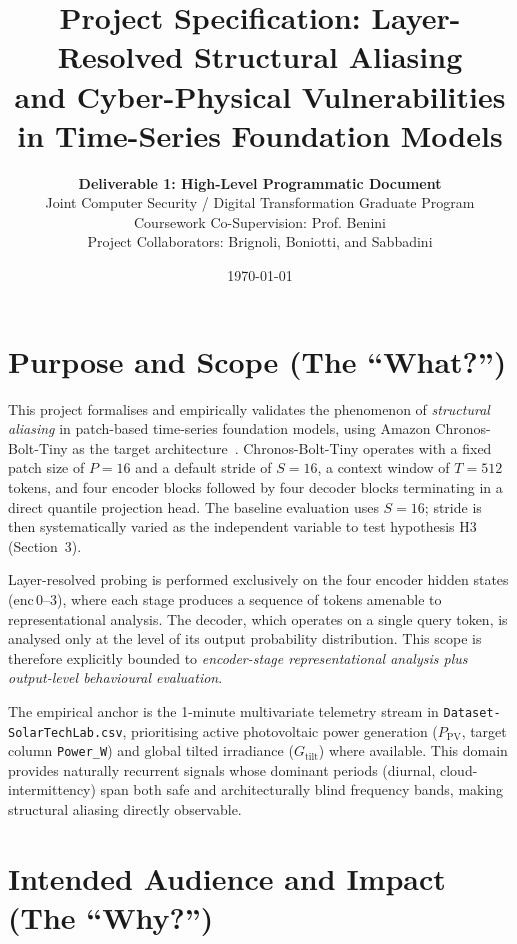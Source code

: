 \documentclass[11pt,a4paper]{article}
\title{\textbf{Project Specification: Layer-Resolved Structural Aliasing\\
and Cyber-Physical Vulnerabilities in Time-Series Foundation Models}}
\author{\textbf{Deliverable 1: High-Level Programmatic Document}\\
Joint Computer Security / Digital Transformation Graduate Program\\
Coursework Co-Supervision: Prof. Benini\\
Project Collaborators: Brignoli, Boniotti, and Sabbadini}
\date{\today}
\begin{document}
\maketitle

\section{Purpose and Scope (The ``What?'')}

This project formalises and empirically validates the phenomenon of \textit{structural aliasing} in patch-based time-series foundation models, using Amazon Chronos-Bolt-Tiny as the target architecture~\cite{ansari2024chronos}. Chronos-Bolt-Tiny operates with a fixed patch size of $P=16$ and a default stride of $S=16$, a context window of $T=512$ tokens, and four encoder blocks followed by four decoder blocks terminating in a direct quantile projection head. The baseline evaluation uses $S=16$; stride is then systematically varied as the independent variable to test hypothesis H3 (Section~3).

Layer-resolved probing is performed exclusively on the four encoder hidden states (enc\,0--3), where each stage produces a sequence of tokens amenable to representational analysis. The decoder, which operates on a single query token, is analysed only at the level of its output probability distribution. This scope is therefore explicitly bounded to \emph{encoder-stage representational analysis plus output-level behavioural evaluation}.

The empirical anchor is the 1-minute multivariate telemetry stream in \texttt{Dataset-SolarTechLab.csv}, prioritising active photovoltaic power generation ($P_{\mathrm{PV}}$, target column \texttt{Power\_W}) and global tilted irradiance ($G_{\mathrm{tilt}}$) where available. This domain provides naturally recurrent signals whose dominant periods (diurnal, cloud-intermittency) span both safe and architecturally blind frequency bands, making structural aliasing directly observable.

\section{Intended Audience and Impact (The ``Why?'')}
\end{document}
